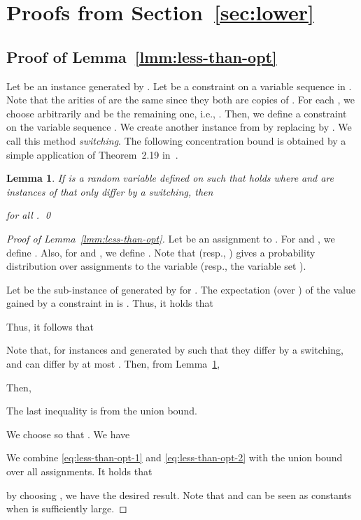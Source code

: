 \documentclass[letterpaper, 11pt]{article}
\newtheorem{lemma}[theorem]{Lemma}
\begin{document}
\section{Proofs from Section~\ref{sec:lower}}\label{apx:lower-appendix}


\subsection{Proof of Lemma~\ref{lmm:less-than-opt}}\label{sec:less-than-opt}
Let  be an instance generated by .
Let  be a constraint on a variable sequence  in .
Note that the arities of  are the same since they both are copies of .
For each ,
we choose  arbitrarily and  be the remaining one, i.e., .
Then, we define a constraint  on the variable sequence .
We create another instance  from  by replacing  by .
We call this method \textit{switching}.
The following concentration bound is obtained by a simple application of Theorem~2.19 in~\cite{Wor99}.
\begin{lemma}\label{lmm:chernoff-reg}
  If  is a random variable defined on  such that  holds where  and  are instances of  that only differ by a switching,
  then
  
  for all .
  \qed
\end{lemma}

\begin{proof}[Proof of Lemma~\ref{lmm:less-than-opt}]
  Let  be an assignment to .
  For  and , we define .
  Also, for  and , we define .
  Note that  (resp., ) gives a probability distribution over assignments to the variable  (resp., the variable set ).

  Let  be the sub-instance of  generated by  for .
  The expectation (over ) of the value gained by a constraint  in  is .
  Thus, it holds that
  
  Thus, it follows that
  

  Note that, for instances  and  generated by  such that they differ by a switching,
   and  can differ by at most .
  Then, from Lemma~\ref{lmm:chernoff-reg}, 
  
  Then,
  
  The last inequality is from the union bound.

  We choose  so that .
  We have
  
  
  We combine \eqref{eq:less-than-opt-1} and \eqref{eq:less-than-opt-2} with the union bound over all  assignments.
  It holds that
  
  by choosing , we have the desired result.
  Note that  and  can be seen as constants when  is sufficiently large.
\end{proof}
\end{document}
